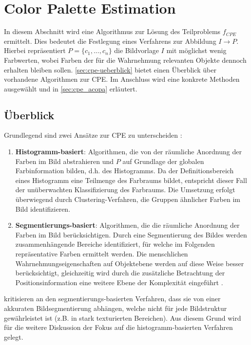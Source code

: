 
\section{Color Palette Estimation}
\label{sec:cpe}

In diesem Abschnitt wird eine Algorithmus zur Lösung des Teilproblems $f_{CPE}$ ermittelt. Dies bedeutet die Festlegung eines Verfahrens zur Abbildung $I \to P$. Hierbei repräsentiert $P = \{c_1, ..., c_n\}$ die Bildvorlage $I$ mit möglichst wenig Farbwerten, wobei Farben der für die Wahrnehmung relevanten Objekte dennoch erhalten bleiben sollen. \autoref{sec:cpe-ueberblick} bietet einen Überblick über vorhandene Algorithmen zur CPE. Im Anschluss wird  eine konkrete Methoden ausgewählt und in \autoref{sec:cpe_acopa} erläutert.

\subsection{Überblick}
\label{sec:cpe-ueberblick}

Grundlegend sind zwei Ansätze zur CPE zu unterscheiden \citep{image-based-schemes}:
\begin{enumerate}
    \item \textbf{Histogramm-basiert}: Algorithmen, die von der räumliche Anordnung der Farben im Bild abstrahieren und $P$ auf Grundlage der globalen Farbinformation bilden, d.h. des Histogramms. Da der Definitionsbereich eines Histogramm eine Teilmenge des Farbraums bildet, entspricht dieser Fall der unüberwachten Klassifizierung des Farbraums. Die Umsetzung erfolgt überwiegend durch Clustering-Verfahren, die Gruppen ähnlicher Farben im Bild identifizieren.
    \item \textbf{Segmentierungs-basiert}: Algorithmen, die die räumliche Anordnung der Farben im Bild berücksichtigen. Durch eine Segmentierung des Bildes werden zusammenhängende Bereiche identifiziert, für welche im Folgenden repräsentative Farben ermittelt werden. Die menschlichen Wahrnehmungseigenschaften auf Objektebene werden auf diese Weise besser berücksichtigt, gleichzeitig wird durch die zusätzliche Betrachtung der Positionsinformation eine weitere Ebene der Komplexität eingeführt \citep{colorthemes}.
\end{enumerate}

\citet{image-based-schemes} kritisieren an den segmentierungs-basierten Verfahren, dass sie von einer akkuraten Bildsegmentierung abhängen, welche nicht für jede Bildstruktur gewährleistet ist (z.B. in stark texturierten Bereichen). Aus diesem Grund wird für die weitere Diskussion der Fokus auf die histogramm-basierten Verfahren gelegt.

